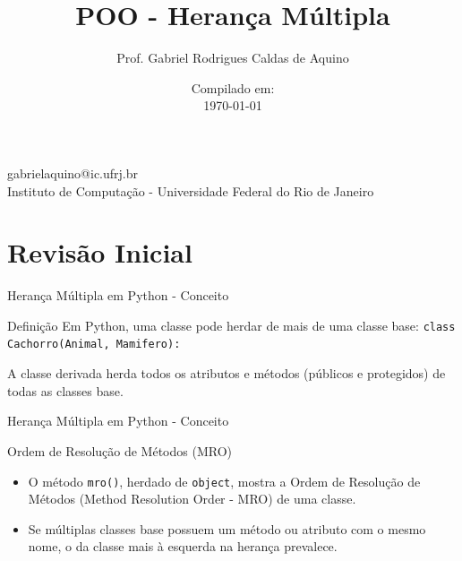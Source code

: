 \title{POO - Herança Múltipla}

\author{Prof. Gabriel Rodrigues Caldas de Aquino}

\institute
{
    gabrielaquino@ic.ufrj.br\\

    Instituto de Computação -
    Universidade Federal do Rio de Janeiro %
}
\date{Compilado em: \\ \today} %


\section{Revisão Inicial}

\begin{frame}
    \titlepage
\end{frame}






\begin{frame}{Herança Múltipla em Python - Conceito}

    \begin{block}{Definição}
        Em Python, uma classe pode herdar de mais de uma classe base:
        \texttt{class Cachorro(Animal, Mamifero):}

        A classe derivada herda todos os atributos e métodos (públicos e protegidos) de todas as classes base.
    \end{block}


\end{frame}


\begin{frame}{Herança Múltipla em Python - Conceito}


    \begin{block}{Ordem de Resolução de Métodos (MRO)}
        \begin{itemize}
            \item O método \texttt{mro()}, herdado de \texttt{object}, mostra a Ordem de Resolução de Métodos (Method Resolution Order - MRO) de uma classe.
            \item Se múltiplas classes base possuem um método ou atributo com o mesmo nome, o da classe mais à esquerda na herança prevalece.
        \end{itemize}
    \end{block}





\end{frame}




